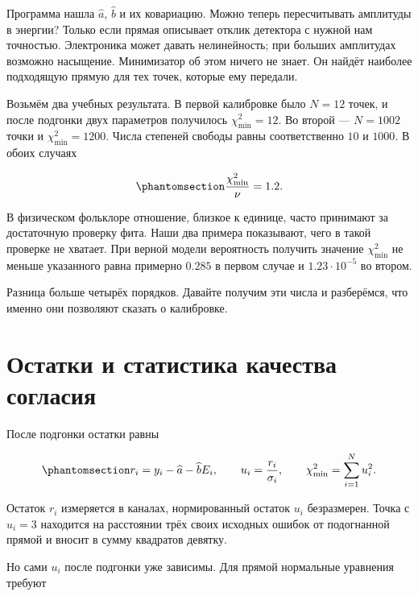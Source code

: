 \documentclass[
  russian,
  11pt,
  a4paper,
  open=any]{scrbook}
\begin{document}
Программа нашла \(\widehat a\), \(\widehat b\) и их ковариацию. Можно
теперь пересчитывать амплитуды в энергии? Только если прямая описывает
отклик детектора с нужной нам точностью. Электроника может давать
нелинейность; при больших амплитудах возможно насыщение. Минимизатор об
этом ничего не знает. Он найдёт наиболее подходящую прямую для тех
точек, которые ему передали.

Возьмём два учебных результата. В первой калибровке было \(N=12\) точек,
и после подгонки двух параметров получилось \(\chi^2_{\min}=12\). Во
второй --- \(N=1002\) точки и \(\chi^2_{\min}=1200\). Числа степеней
свободы равны соответственно \(10\) и \(1000\). В обоих случаях

\begin{equation}\protect\phantomsection\label{eq-ch13-same-reduced-chi-square}{
\frac{\chi^2_{\min}}{\nu}=1.2.
}\end{equation}

В физическом фольклоре отношение, близкое к единице, часто принимают за
достаточную проверку фита. Наши два примера показывают, чего в такой
проверке не хватает. При верной модели вероятность получить значение
\(\chi^2_{\min}\) не меньше указанного равна примерно \(0.285\) в первом
случае и \(1.23\cdot10^{-5}\) во втором.

Разница больше четырёх порядков. Давайте получим эти числа и разберёмся,
что именно они позволяют сказать о калибровке.

\section{Остатки и статистика качества
согласия}\label{ux43eux441ux442ux430ux442ux43aux438-ux438-ux441ux442ux430ux442ux438ux441ux442ux438ux43aux430-ux43aux430ux447ux435ux441ux442ux432ux430-ux441ux43eux433ux43bux430ux441ux438ux44f}

После подгонки остатки равны

\begin{equation}\protect\phantomsection\label{eq-ch13-fit-residuals}{
r_i=y_i-\widehat a-\widehat bE_i,
\qquad u_i=\frac{r_i}{\sigma_i},
\qquad \chi^2_{\min}=\sum_{i=1}^N u_i^2.
}\end{equation}

Остаток \(r_i\) измеряется в каналах, нормированный остаток \(u_i\)
безразмерен. Точка с \(u_i=3\) находится на расстоянии трёх своих
исходных ошибок от подогнанной прямой и вносит в сумму квадратов
девятку.

Но сами \(u_i\) после подгонки уже зависимы. Для прямой нормальные
уравнения требуют
\end{document}
